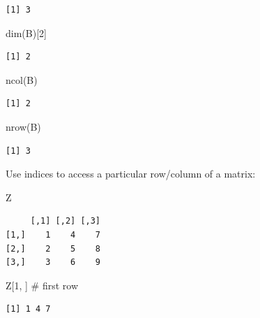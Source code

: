 \documentclass[
  letterpaper,
  DIV=11,
  numbers=noendperiod]{scrreprt}
\newenvironment{Shaded}{\begin{snugshade}}{\end{snugshade}}
\newcommand{\CommentTok}[1]{\textcolor[rgb]{0.37,0.37,0.37}{#1}}
\newcommand{\DecValTok}[1]{\textcolor[rgb]{0.68,0.00,0.00}{#1}}
\newcommand{\FunctionTok}[1]{\textcolor[rgb]{0.28,0.35,0.67}{#1}}
\newcommand{\NormalTok}[1]{\textcolor[rgb]{0.00,0.23,0.31}{#1}}
\begin{document}
\begin{verbatim}
[1] 3
\end{verbatim}

\begin{Shaded}
\begin{Highlighting}[]
\FunctionTok{dim}\NormalTok{(B)[}\DecValTok{2}\NormalTok{]}
\end{Highlighting}
\end{Shaded}

\begin{verbatim}
[1] 2
\end{verbatim}

\begin{Shaded}
\begin{Highlighting}[]
\FunctionTok{ncol}\NormalTok{(B)}
\end{Highlighting}
\end{Shaded}

\begin{verbatim}
[1] 2
\end{verbatim}

\begin{Shaded}
\begin{Highlighting}[]
\FunctionTok{nrow}\NormalTok{(B)}
\end{Highlighting}
\end{Shaded}

\begin{verbatim}
[1] 3
\end{verbatim}

Use indices to access a particular row/column of a matrix:

\begin{Shaded}
\begin{Highlighting}[]
\NormalTok{Z}
\end{Highlighting}
\end{Shaded}

\begin{verbatim}
     [,1] [,2] [,3]
[1,]    1    4    7
[2,]    2    5    8
[3,]    3    6    9
\end{verbatim}

\begin{Shaded}
\begin{Highlighting}[]
\NormalTok{Z[}\DecValTok{1}\NormalTok{, ] }\CommentTok{\# first row}
\end{Highlighting}
\end{Shaded}

\begin{verbatim}
[1] 1 4 7
\end{verbatim}
\end{document}
